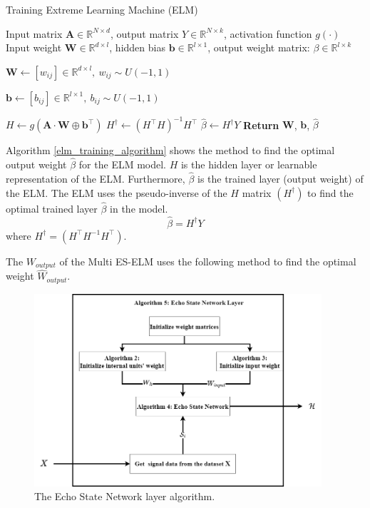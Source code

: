 \begin{algorithm}
  \caption{Training Extreme Learning Machine (ELM)}
  \label{elm_training_algorithm}
  \begin{algorithmic}[1]
    \renewcommand{\algorithmicrequire}{\textbf{Input:}}
    \renewcommand{\algorithmicensure}{\textbf{Output:}}
    \Require Input matrix $\mathbf{A} \in \mathbb{R}^{N \times d}$, output matrix $Y \in \mathbb{R}^{N \times k}$, activation function $g(\cdot)$
    \Ensure Input weight $\mathbf{W} \in \mathbb{R}^{d \times l}$, hidden bias $\mathbf{b} \in \mathbb{R}^{l \times 1}$, output weight matrix: $\beta \in \mathbb{R}^{l \times k}$

    \State $\mathbf{W}\gets [w_{ij}] \in \mathbb{R}^{d \times l},\  w_{ij} \sim U(-1, 1)$
    
    \State $\mathbf{b}\gets [b_{ij}] \in \mathbb{R}^{l \times 1},\  b_{ij} \sim U(-1, 1)$ 
    
    \State$H \gets g(\mathbf{A} \cdot \mathbf{W} \oplus \mathbf{b}^\top)$
    \State $H^\dagger \gets (H^\top  H)^{-1}  H^\top$
    \State $\hat{\beta} \gets H^\dagger Y$
    \State \textbf{Return} $\mathbf{W}$, $\mathbf{b}$, $\hat{\beta}$
  \end{algorithmic}
\end{algorithm}

Algorithm \ref{elm_training_algorithm} shows the method to find the optimal output weight $\hat{\beta}$ for the ELM model. $H$ is the hidden layer or learnable representation of the ELM. Furthermore, $\hat\beta$ is the trained layer (output weight) of the ELM. The ELM uses the pseudo-inverse of the $H$ matrix $(H^{\dagger})$ to find the optimal trained layer $\hat{\beta}$ in the model\cite{huang2006extreme}.
$$\hat{\beta} = H^{\dagger}Y$$
where $H^{\dagger} = (H^\top H^{-1}H^\top)$.

The $W_{output}$ of the Multi ES-ELM uses the following method to find the optimal weight $\hat{W}_{output}$. 

\begin{figure}[ht]
    \centering
    \includegraphics[width=0.95\textwidth]{img/Algorithm1.png}
    \caption{The Echo State Network layer algorithm.}
    \label{fig:Algorithm-ESN}
\end{figure}

